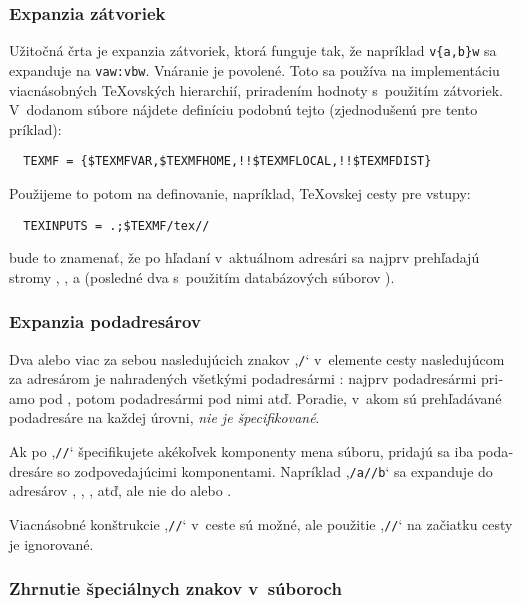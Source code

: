 \documentclass[\classoptions,slovak,english,czech]{\classname}
\newcommand{\singleuv}[1]{,#1`}
\begin{document}
\begin{otherlanguage}{slovak}
\subsubsection{Expanzia zátvoriek}
\label{sec:brace-expansion}

Užitočná črta je expanzia zátvoriek, ktorá funguje tak, že
napríklad \verb+v{a,b}w+ sa expanduje na \verb+vaw:vbw+. Vnáranie je
povolené. Toto sa používa na implementáciu viacnásobných
\TeX{}ovských hierarchií, priradením hodnoty 
s~použitím zátvoriek. V~dodanom súbore  nájdete 
definíciu podobnú tejto (zjednodušenú pre tento príklad):
\begin{verbatim}
  TEXMF = {$TEXMFVAR,$TEXMFHOME,!!$TEXMFLOCAL,!!$TEXMFDIST}
\end{verbatim}
Použijeme to potom na definovanie, napríklad, \TeX{}ovskej cesty pre vstupy:
\begin{verbatim}
  TEXINPUTS = .;$TEXMF/tex//
\end{verbatim}
bude to znamenať, že po hľadaní v~aktuálnom adresári sa najprv prehľadajú
stromy , , 
a  (posledné dva
s~použitím databázových súborov ). 

\subsubsection{Expanzia podadresárov}
\label{sec:subdirectory.expansion}

Dva alebo viac za sebou nasledujúcich znakov \singleuv{\texttt{/}} 
v~elemente cesty nasledujúcom za adresárom  je nahradených všetkými
podadresármi : najprv podadresármi priamo pod , potom
podadresármi pod nimi atď. Poradie, v~akom sú prehľadávané
podadresáre na každej úrovni, \emph{nie je špecifikované}.

Ak po \singleuv{\texttt{//}} špecifikujete akékoľvek komponenty mena súboru,
pridajú sa iba pod\-adre\-sáre so zodpovedajúcimi komponentami.
Napríklad \singleuv{\texttt{/a//b}} sa expanduje do
adresárov , ,
, atď, ale nie do  alebo .

Viacnásobné konštrukcie \singleuv{\texttt{//}} v~ceste sú možné, ale
použitie \singleuv{\texttt{//}} na začiatku cesty je ignorované.

\subsubsection{Zhrnutie špeciálnych znakov v~súboroch }
\label{sec:cnf-special-chars}


\end{otherlanguage}
\end{document}
